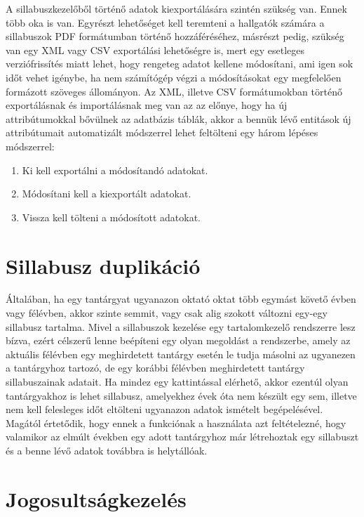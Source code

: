 \documentclass[hidelinks, 12pt, a4paper]{report}
\begin{document}
A sillabuszkezelőből történő adatok kiexportálására szintén szükség van. Ennek több oka is van. Egyrészt lehetőséget kell teremteni a hallgatók számára a sillabuszok PDF formátumban történő hozzáféréséhez, másrészt pedig, szükség van egy XML vagy CSV exportálási lehetőségre is, mert egy esetleges verziófrissítés miatt lehet, hogy rengeteg adatot kellene módosítani, ami igen sok időt vehet igénybe, ha nem számítógép végzi a módosításokat egy megfelelően formázott szöveges állományon. Az XML, illetve CSV formátumokban történő exportálásnak és importálásnak meg van az az előnye, hogy ha új attribútumokkal bővülnek az adatbázis táblák, akkor a bennük lévő entitások új attribútumait automatizált módszerrel lehet feltölteni egy három lépéses módszerrel:

\begin{enumerate}
\item Ki kell exportálni a módosítandó adatokat.
\item Módosítani kell a kiexportált adatokat.
\item Vissza kell tölteni a módosított adatokat.
\end{enumerate}

\section{Sillabusz duplikáció}

Általában, ha egy tantárgyat ugyanazon oktató oktat több egymást követő évben vagy félévben, akkor szinte semmit, vagy csak alig szokott változni egy-egy sillabusz tartalma. Mivel a sillabuszok kezelése egy tartalomkezelő rendszerre lesz bízva, ezért célszerű lenne beépíteni egy olyan megoldást a rendszerbe, amely az aktuális félévben egy meghirdetett tantárgy esetén le tudja másolni az ugyanezen a tantárgyhoz tartozó, de egy korábbi félévben meghirdetett tantárgy sillabuszainak adatait. Ha mindez egy kattintással elérhető, akkor ezentúl olyan tantárgyakhoz is lehet sillabusz, amelyekhez évek óta nem készült egy sem, illetve nem kell felesleges időt eltölteni ugyanazon adatok ismételt begépelésével. Magától értetődik, hogy ennek a funkciónak a használata azt feltételezné, hogy valamikor az elmúlt években egy adott tantárgyhoz már létrehoztak egy sillabuszt és a benne lévő adatok továbbra is helytállóak.

\section{Jogosultságkezelés}
\end{document}
